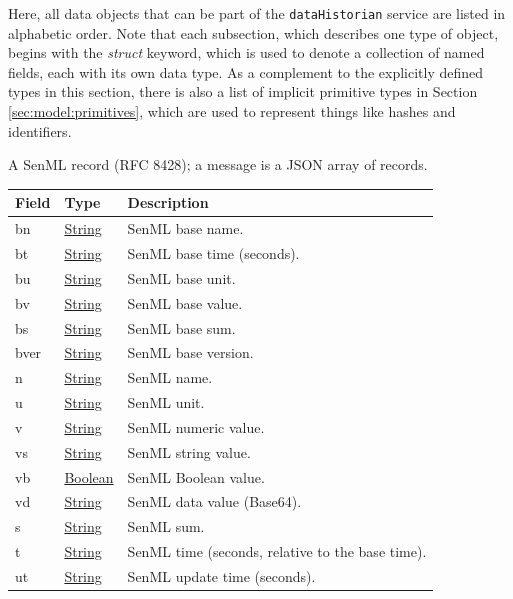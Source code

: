 \documentclass[a4paper]{arrowhead}
\newcommand{\pref}[1]{{\textcolor{ArrowheadGrey}{\hyperref[sec:model:primitives:#1]{#1}}}}
\begin{document}
Here, all data objects that can be part of the \texttt{dataHistorian} service are listed in alphabetic order.
Note that each subsection, which describes one type of object, begins with the \textit{struct} keyword, which is used to denote a collection of named fields, each with its own data type.
As a complement to the explicitly defined types in this section, there is also a list of implicit primitive types in Section \ref{sec:model:primitives}, which are used to represent things like hashes and identifiers.


A SenML record (RFC 8428); a message is a JSON array of records.


\noindent\begin{tabularx}{\textwidth}{| >{\raggedright\arraybackslash}p{3.9cm} | >{\raggedright\arraybackslash\small}p{5.3cm} | X |} \hline
\rowcolor{gray!33} Field & Type & Description \\ \hline
bn & \pref{String} & SenML base name. \\ \hline
bt & \pref{String} & SenML base time (seconds). \\ \hline
bu & \pref{String} & SenML base unit. \\ \hline
bv & \pref{String} & SenML base value. \\ \hline
bs & \pref{String} & SenML base sum. \\ \hline
bver & \pref{String} & SenML base version. \\ \hline
n & \pref{String} & SenML name. \\ \hline
u & \pref{String} & SenML unit. \\ \hline
v & \pref{String} & SenML numeric value. \\ \hline
vs & \pref{String} & SenML string value. \\ \hline
vb & \pref{Boolean} & SenML Boolean value. \\ \hline
vd & \pref{String} & SenML data value (Base64). \\ \hline
s & \pref{String} & SenML sum. \\ \hline
t & \pref{String} & SenML time (seconds, relative to the base time). \\ \hline
ut & \pref{String} & SenML update time (seconds). \\ \hline
\end{tabularx}



\end{document}
